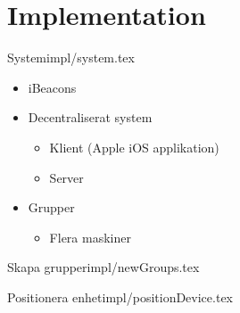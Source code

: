 \section{Implementation}


\begin{notedFrame}{System}{impl/system.tex}
	\begin{itemize}
		\item iBeacons
		\item Decentraliserat system
			\begin{itemize}
				\item Klient (Apple iOS applikation)
				\item Server
			\end{itemize}

		\item Grupper
			\begin{itemize}
				\item Flera maskiner
			\end{itemize}
	\end{itemize}
\end{notedFrame}


\begin{notedFrame}{Skapa grupper}{impl/newGroups.tex}
\end{notedFrame}


\begin{notedFrame}{Positionera enhet}{impl/positionDevice.tex}
\end{notedFrame}

